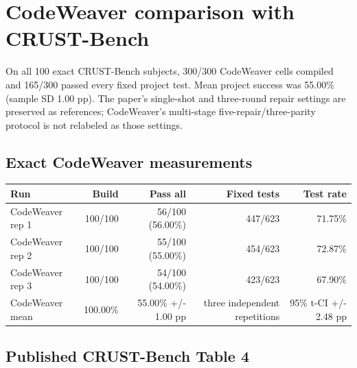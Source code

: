 \documentclass{article}
\begin{document}
\section*{CodeWeaver comparison with CRUST-Bench}

On all 100 exact CRUST-Bench subjects, 300/300 CodeWeaver cells compiled and 165/300 passed every fixed project test. Mean project success was 55.00\% (sample SD 1.00 pp). The paper's single-shot and three-round repair settings are preserved as references; CodeWeaver's multi-stage five-repair/three-parity protocol is not relabeled as those settings.

\subsection*{Exact CodeWeaver measurements}

\begin{tabular}{lrrrr}
\toprule
Run & Build & Pass all & Fixed tests & Test rate \\
\midrule
CodeWeaver rep 1 & 100/100 & 56/100 (56.00\%) & 447/623 & 71.75\% \\
CodeWeaver rep 2 & 100/100 & 55/100 (55.00\%) & 454/623 & 72.87\% \\
CodeWeaver rep 3 & 100/100 & 54/100 (54.00\%) & 423/623 & 67.90\% \\
CodeWeaver mean & 100.00\% & 55.00\% +/- 1.00 pp & three independent repetitions & 95\% t-CI +/- 2.48 pp \\
\bottomrule
\end{tabular}

\subsection*{Published CRUST-Bench Table 4}
\end{document}
